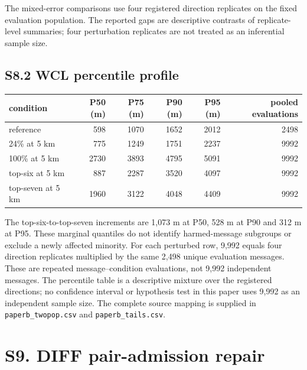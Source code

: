 \documentclass[journal,onecolumn,10pt]{IEEEtran}
\begin{document}
The mixed-error comparisons use four registered direction replicates on the fixed evaluation population. The reported gaps are descriptive contrasts of replicate-level summaries; four perturbation replicates are not treated as an inferential sample size.

\subsection*{S8.2 WCL percentile profile}\label{s8.2-wcl-percentile-profile}

\begin{center}\begin{minipage}{\textwidth}\centering
{}

\begin{tabular}{@{}lrrrrr@{}}
\toprule\noalign{}
condition & P50 (m) & P75 (m) & P90 (m) & P95 (m) & pooled evaluations \\
\midrule\noalign{}

reference & 598 & 1070 & 1652 & 2012 & 2498 \\
24\% at 5 km & 775 & 1249 & 1751 & 2237 & 9992 \\
100\% at 5 km & 2730 & 3893 & 4795 & 5091 & 9992 \\
top-six at 5 km & 887 & 2287 & 3520 & 4097 & 9992 \\
top-seven at 5 km & 1960 & 3122 & 4048 & 4409 & 9992 \\
\bottomrule
\end{tabular}
\end{minipage}\end{center}

The top-six-to-top-seven increments are 1,073 m at P50, 528 m at P90 and 312 m at P95. These marginal quantiles do not identify harmed-message subgroups or exclude a newly affected minority. For each perturbed row, 9,992 equals four direction replicates multiplied by the same 2,498 unique evaluation messages. These are repeated message--condition evaluations, not 9,992 independent messages. The percentile table is a descriptive mixture over the registered directions; no confidence interval or hypothesis test in this paper uses 9,992 as an independent sample size. The complete source mapping is supplied in \texttt{paperb\_twopop.csv} and \texttt{paperb\_tails.csv}.

\section*{S9. DIFF pair-admission repair}\label{s9.-diff-pair-admission-repair}
\end{document}
